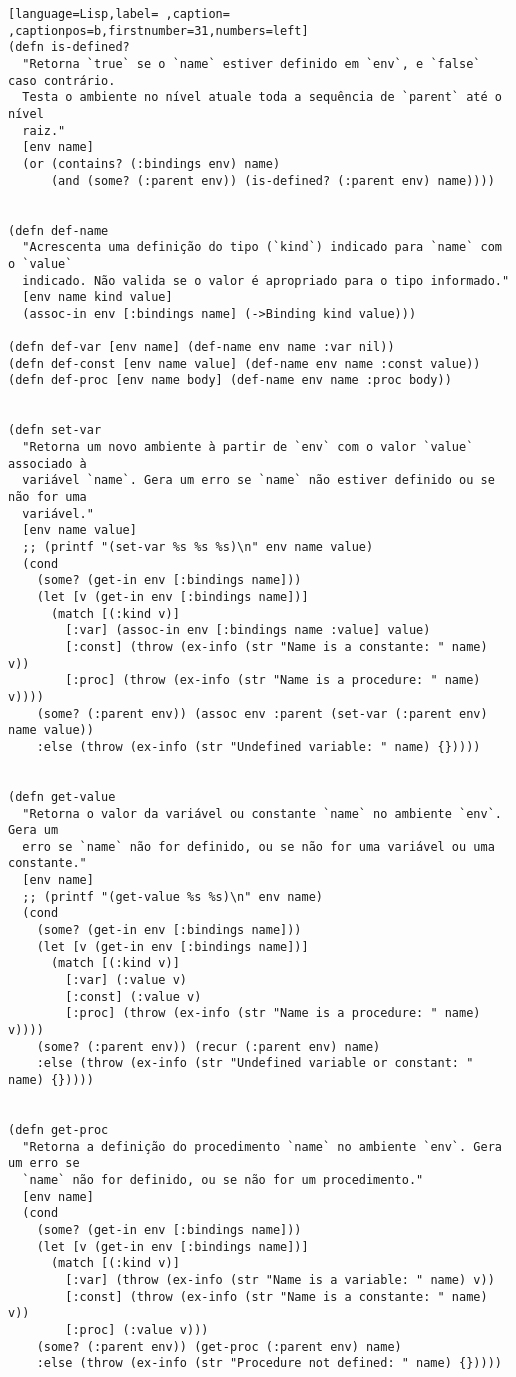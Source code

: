 \documentclass{scrartcl}
\begin{document}
\begin{lstlisting}[language=Lisp,label= ,caption= ,captionpos=b,firstnumber=31,numbers=left]
(defn is-defined?
  "Retorna `true` se o `name` estiver definido em `env`, e `false` caso contrário.
  Testa o ambiente no nível atuale toda a sequência de `parent` até o nível
  raiz."
  [env name]
  (or (contains? (:bindings env) name)
      (and (some? (:parent env)) (is-defined? (:parent env) name))))


(defn def-name
  "Acrescenta uma definição do tipo (`kind`) indicado para `name` com o `value`
  indicado. Não valida se o valor é apropriado para o tipo informado."
  [env name kind value]
  (assoc-in env [:bindings name] (->Binding kind value)))

(defn def-var [env name] (def-name env name :var nil))
(defn def-const [env name value] (def-name env name :const value))
(defn def-proc [env name body] (def-name env name :proc body))


(defn set-var
  "Retorna um novo ambiente à partir de `env` com o valor `value` associado à
  variável `name`. Gera um erro se `name` não estiver definido ou se não for uma
  variável."
  [env name value]
  ;; (printf "(set-var %s %s %s)\n" env name value)
  (cond
    (some? (get-in env [:bindings name]))
    (let [v (get-in env [:bindings name])]
      (match [(:kind v)]
        [:var] (assoc-in env [:bindings name :value] value)
        [:const] (throw (ex-info (str "Name is a constante: " name) v))
        [:proc] (throw (ex-info (str "Name is a procedure: " name) v))))
    (some? (:parent env)) (assoc env :parent (set-var (:parent env) name value))
    :else (throw (ex-info (str "Undefined variable: " name) {}))))


(defn get-value
  "Retorna o valor da variável ou constante `name` no ambiente `env`. Gera um
  erro se `name` não for definido, ou se não for uma variável ou uma constante."
  [env name]
  ;; (printf "(get-value %s %s)\n" env name)
  (cond
    (some? (get-in env [:bindings name]))
    (let [v (get-in env [:bindings name])]
      (match [(:kind v)]
        [:var] (:value v)
        [:const] (:value v)
        [:proc] (throw (ex-info (str "Name is a procedure: " name) v))))
    (some? (:parent env)) (recur (:parent env) name)
    :else (throw (ex-info (str "Undefined variable or constant: " name) {}))))


(defn get-proc
  "Retorna a definição do procedimento `name` no ambiente `env`. Gera um erro se
  `name` não for definido, ou se não for um procedimento."
  [env name]
  (cond
    (some? (get-in env [:bindings name]))
    (let [v (get-in env [:bindings name])]
      (match [(:kind v)]
        [:var] (throw (ex-info (str "Name is a variable: " name) v))
        [:const] (throw (ex-info (str "Name is a constante: " name) v))
        [:proc] (:value v)))
    (some? (:parent env)) (get-proc (:parent env) name)
    :else (throw (ex-info (str "Procedure not defined: " name) {}))))
\end{lstlisting}
\end{document}
